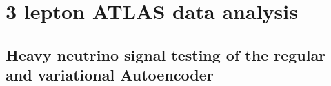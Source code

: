 \newpage
\section{3 lepton ATLAS data analysis}

\subsection*{Heavy neutrino signal testing of the regular and variational Autoencoder}